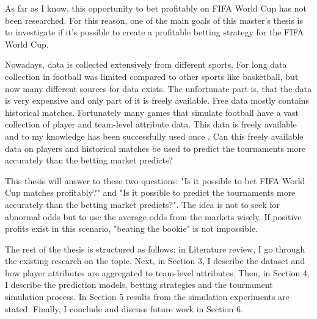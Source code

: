 As far as I know, this opportunity to bet profitably on FIFA World Cup has not been researched. For this reason, one of the main goals of this master's thesis is to investigate if it's possible to create a profitable betting strategy for the FIFA World Cup.

Nowadays, data is collected extensively from different sports. For long data collection in football was limited compared to other sports like basketball, but now many different sources for data exists. The unfortunate part is, that the data is very expensive and only part of it is freely available. Free data mostly contains historical matches. Fortunately many games that simulate football have a vast collection of player and team-level attribute data. This data is freely available and to my knowledge has been successfully used once \cite{shin2014novel}. Can this freely available data on players and historical matches be used to predict the tournaments more accurately than the betting market predicts?

This thesis will answer to these two questions: "Is it possible to bet FIFA World Cup matches profitably?" and "Is it possible to predict the tournaments more accurately than the betting market predicts?". The idea is not to seek for abnormal odds but to use the average odds from the markets wisely. If positive profits exist in this scenario, "beating the bookie" is not impossible.

The rest of the thesis is structured as follows: in Literature review, I go through the existing research on the topic. Next, in Section 3, I describe the dataset and how player attributes are aggregated to team-level attributes. Then, in Section 4, I describe the prediction models, betting strategies and the tournament simulation process. In Section 5 results from the simulation experiments are stated. Finally, I conclude and discuss future work in Section 6.